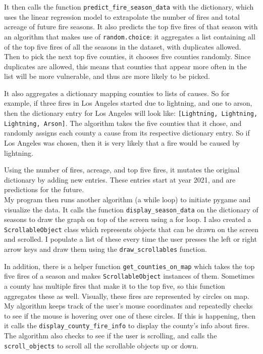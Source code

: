 \documentclass[fontsize=11pt]{article}
\begin{document}
It then calls the function \texttt{predict\_fire\_season\_data} with the dictionary, which uses the linear regression model to extrapolate the number of fires and total acreage of future fire seasons. It also predicts the top five fires of that season with an algorithm that makes use of \texttt{random.choice}: it aggregates a list containing all of the top five fires of all the seasons in the dataset, with duplicates allowed. Then to pick the next top five counties, it chooses five counties randomly. Since duplicates are allowed, this means that counties that appear more often in the list will be more vulnerable, and thus are more likely to be picked.

It also aggregates a dictionary mapping counties to lists of causes. So for example, if three fires in Los Angeles started due to lightning, and one to arson, then the dictionary entry for Los Angeles will look like: \texttt{[Lightning, Lightning, Lightning, Arson]}. The algorithm takes the five counties that it chose, and randomly assigns each county a cause from its respective dictionary entry. So if Los Angeles was chosen, then it is very likely that a fire would be caused by lightning.

Using the number of fires, acreage, and top five fires, it mutates the original dictionary by adding new entries. These entries start at year 2021, and are predictions for the future.\\

My program then runs another algorithm (a while loop) to initiate pygame and visualize the data. It calls the function \texttt{display\_season\_data} on the dictionary of seasons to draw the graph on top of the screen using a for loop. I also created a \texttt{ScrollableObject} class which represents objects that can be drawn on the screen and scrolled. I populate a list of these every time the user presses the left or right arrow keys and draw them using the \texttt{draw\_scrollables} function.

In addition, there is a helper function \texttt{get\_counties\_on\_map} which takes the top five fires of a season and makes \texttt{ScrollableObject} instances of them. Sometimes a county has multiple fires that make it to the top five, so this function aggregates these as well. Visually, these fires are represented by circles on map. My algorithm keeps track of the user's mouse coordinates and repeatedly checks to see if the mouse is hovering over one of these circles. If this is happening, then it calls the \texttt{display\_county\_fire\_info} to display the county's info about fires. The algorithm also checks to see if the user is scrolling, and calls the \texttt{scroll\_objects} to scroll all the scrollable objects up or down.\\
\end{document}
